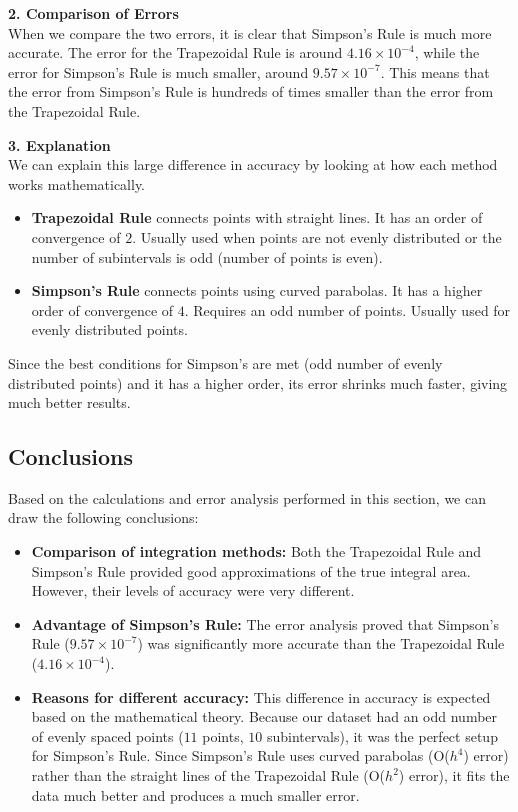 \vspace{5pt}
\noindent\textbf{2. Comparison of Errors} \\
When we compare the two errors, it is clear that Simpson's Rule is much more accurate. The error for the Trapezoidal Rule is around $4.16 \times 10^{-4}$, while the error for Simpson's Rule is much smaller, around $9.57 \times 10^{-7}$. This means that the error from Simpson's Rule is hundreds of times smaller than the error from the Trapezoidal Rule.

\vspace{5pt}
\noindent\textbf{3. Explanation} \\
We can explain this large difference in accuracy by looking at how each method works mathematically.
\begin{itemize}
    \item \textbf{Trapezoidal Rule} connects points with straight lines. It has an order of convergence of $2$. Usually used when points are not evenly distributed or the number of subintervals is odd (number of points is even).
    \item \textbf{Simpson's Rule} connects points using curved parabolas. It has a higher order of convergence of $4$. Requires an odd number of points. Usually used for evenly distributed points. 
\end{itemize}

Since the best conditions for Simpson's are met (odd number of evenly distributed points) and it has a higher order, its error shrinks much faster, giving much better results.

\subsection{Conclusions}

Based on the calculations and error analysis performed in this section, we can draw the following conclusions:

\begin{itemize}
    \item \textbf{Comparison of integration methods:} Both the Trapezoidal Rule and Simpson's Rule provided good approximations of the true integral area. However, their levels of accuracy were very different.
    
    \item \textbf{Advantage of Simpson's Rule:} The error analysis proved that Simpson's Rule ($9.57 \times 10^{-7}$) was significantly more accurate than the Trapezoidal Rule ($4.16 \times 10^{-4}$).
    
    \item \textbf{Reasons for different accuracy:} This difference in accuracy is expected based on the mathematical theory. Because our dataset had an odd number of evenly spaced points ($11$ points, $10$ subintervals), it was the perfect setup for Simpson's Rule. Since Simpson's Rule uses curved parabolas (O($h^4$) error) rather than the straight lines of the Trapezoidal Rule (O($h^2$) error), it fits the data much better and produces a much smaller error.
\end{itemize}

